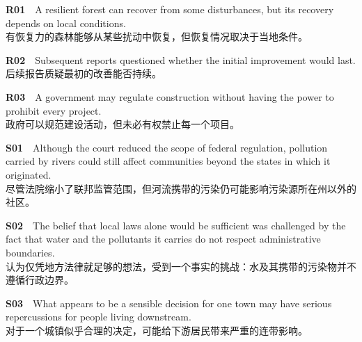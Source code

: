 \documentclass[a4paper,11pt,openany]{report}
\newcommand{\zhline}[1]{{\CJKsf\color{bodygrey}#1}}
\begin{document}
\begin{samepage}
\textbf{R01}　A resilient forest can recover from some disturbances, but its recovery depends on local conditions.\\
\zhline{有恢复力的森林能够从某些扰动中恢复，但恢复情况取决于当地条件。}
\par\end{samepage}

\begin{samepage}
\textbf{R02}　Subsequent reports questioned whether the initial improvement would last.\\
\zhline{后续报告质疑最初的改善能否持续。}
\par\end{samepage}

\begin{samepage}
\textbf{R03}　A government may regulate construction without having the power to prohibit every project.\\
\zhline{政府可以规范建设活动，但未必有权禁止每一个项目。}
\par\end{samepage}

\begin{samepage}
\textbf{S01}　Although the court reduced the scope of federal regulation, pollution carried by rivers could still affect communities beyond the states in which it originated.\\
\zhline{尽管法院缩小了联邦监管范围，但河流携带的污染仍可能影响污染源所在州以外的社区。}
\par\end{samepage}

\begin{samepage}
\textbf{S02}　The belief that local laws alone would be sufficient was challenged by the fact that water and the pollutants it carries do not respect administrative boundaries.\\
\zhline{认为仅凭地方法律就足够的想法，受到一个事实的挑战：水及其携带的污染物并不遵循行政边界。}
\par\end{samepage}

\begin{samepage}
\textbf{S03}　What appears to be a sensible decision for one town may have serious repercussions for people living downstream.\\
\zhline{对于一个城镇似乎合理的决定，可能给下游居民带来严重的连带影响。}
\par\end{samepage}
\end{document}
